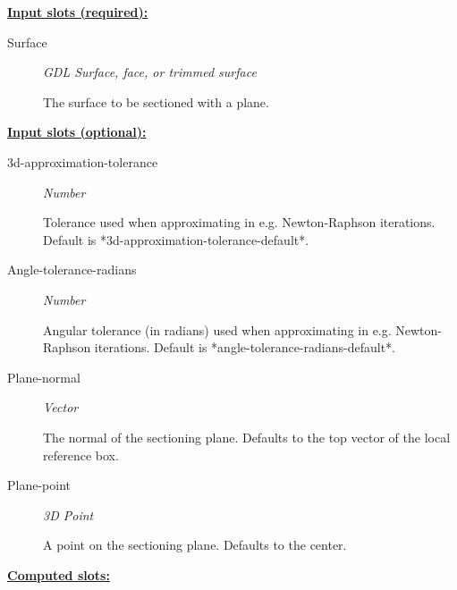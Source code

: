 \documentclass [11pt]{book}
\begin{document}
\begin{itemize}
\textbf{
\underline{Input slots (required):}}

\begin{description}

\item [Surface]
\emph{GDL Surface, face, or trimmed surface}

 The surface to be sectioned with a plane.




\end{description}






\textbf{
\underline{Input slots (optional):}}

\begin{description}

\item [3d-approximation-tolerance]
\emph{Number}

 Tolerance used when approximating in e.g. Newton-Raphson iterations.
Default is *3d-approximation-tolerance-default*.




\item [Angle-tolerance-radians]
\emph{Number}

 Angular tolerance (in radians) used when approximating in e.g. Newton-Raphson iterations.
Default is *angle-tolerance-radians-default*.




\item [Plane-normal]
\emph{Vector}

 The normal of the sectioning plane. Defaults to the top vector of the local reference box.




\item [Plane-point]
\emph{3D Point}

 A point on the sectioning plane. Defaults to the center.




\end{description}






\textbf{
\underline{Computed slots:}}

\begin{description}


\end{description}
\end{itemize}
\end{document}
